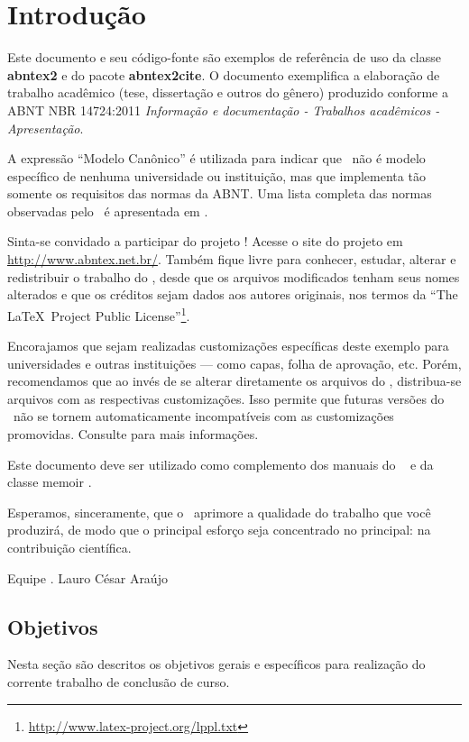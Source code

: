 \chapter{Introdução}

Este documento e seu código-fonte são exemplos de referência de uso da classe \textbf{abntex2} e do pacote \textbf{abntex2cite}. O documento exemplifica a elaboração de trabalho acadêmico (tese, dissertação e outros do gênero) produzido conforme a ABNT NBR 14724:2011 \emph{Informação e documentação - Trabalhos acadêmicos - Apresentação}.

A expressão ``Modelo Canônico'' é utilizada para indicar que \abnTeX\ não é modelo específico de nenhuma universidade ou instituição, mas que implementa tão somente os requisitos das normas da ABNT. Uma lista completa das normas observadas pelo \abnTeX\ é apresentada em .

Sinta-se convidado a participar do projeto \abnTeX! Acesse o site do projeto em \url{http://www.abntex.net.br/}. Também fique livre para conhecer, estudar, alterar e redistribuir o trabalho do \abnTeX, desde que os arquivos modificados tenham seus nomes alterados e que os créditos sejam dados aos autores originais, nos termos da ``The \LaTeX\ Project Public License''\footnote{\url{http://www.latex-project.org/lppl.txt}}.

Encorajamos que sejam realizadas customizações específicas deste exemplo para universidades e outras instituições --- como capas, folha de aprovação, etc. Porém, recomendamos que ao invés de se alterar diretamente os arquivos do \abnTeX, distribua-se arquivos com as respectivas customizações. Isso permite que futuras versões do \abnTeX~não se tornem automaticamente incompatíveis com as customizações promovidas. Consulte  para mais informações.

Este documento deve ser utilizado como complemento dos manuais do \abnTeX\ \cite{abntex2classe,abntex2cite,abntex2cite-alf} e da classe \textsf{memoir} \cite{memoir}. 

Esperamos, sinceramente, que o \abnTeX\ aprimore a qualidade do trabalho que você produzirá, de modo que o principal esforço seja concentrado no principal: na contribuição científica. 

Equipe \abnTeX. Lauro César Araújo

\section{Objetivos}\label{sec-divisoes}
Nesta seção são descritos os objetivos gerais e específicos para realização do corrente trabalho de conclusão de curso.


